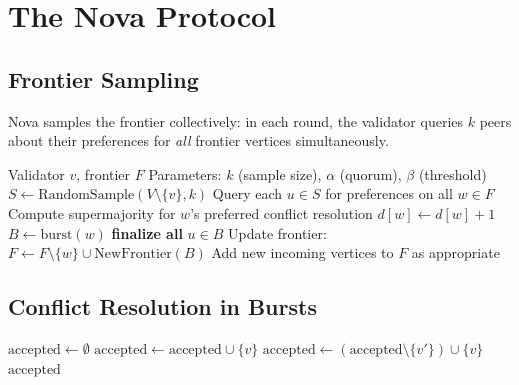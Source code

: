 \section{The Nova Protocol}

\label{sec:protocol}

\subsection{Frontier Sampling}

Nova samples the frontier collectively: in each round, the validator queries $k$ peers
about their preferences for \emph{all} frontier vertices simultaneously.

\begin{algorithm}[H]
\caption{Nova Protocol --- Frontier-Based Burst Finalization}
\label{alg:nova-core}
\begin{algorithmic}[1]
\Require Validator $v$, frontier $F$
\Require Parameters: $k$ (sample size), $\alpha$ (quorum), $\beta$ (threshold)
    \State $S \gets \text{RandomSample}(V \setminus \{v\}, k)$
    \State Query each $u \in S$ for preferences on all $w \in F$
        \State Compute supermajority for $w$'s preferred conflict resolution
            \State $d[w] \gets d[w] + 1$
        \EndIf
            \State $B \gets \text{burst}(w)$ 
            \State \textbf{finalize all} $u \in B$ 
            \State Update frontier: $F \gets F \setminus \{w\} \cup \text{NewFrontier}(B)$
        \EndIf
    \EndFor
    \State Add new incoming vertices to $F$ as appropriate
\EndWhile
\end{algorithmic}
\end{algorithm}

\subsection{Conflict Resolution in Bursts}

\begin{algorithm}[H]
\caption{Nova Conflict Resolution During Burst}
\label{alg:nova-conflict}
\begin{algorithmic}[1]
    \State $\text{accepted} \gets \emptyset$
     
            \State $\text{accepted} \gets \text{accepted} \cup \{v\}$
        \Else
            \State {}
                    \State $\text{accepted} \gets (\text{accepted} \setminus \{v'\}) \cup \{v\}$
                \EndIf
            \EndFor
        \EndIf
    \EndFor
    \Return $\text{accepted}$
\EndFunction
\end{algorithmic}
\end{algorithm}

